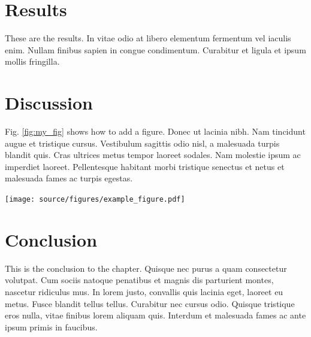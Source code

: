 \documentclass[12pt,a4paper,]{report}
\let\origfigure=\figure
\let\endorigfigure=\endfigure
\renewenvironment{figure}[1][]{%
\origfigure[b]
}{%
\endorigfigure
}
\begin{document}
\hypertarget{results-1}{%
\section{Results}\label{results-1}}

These are the results. In vitae odio at libero elementum fermentum vel
iaculis enim. Nullam finibus sapien in congue condimentum. Curabitur et
ligula et ipsum mollis fringilla.

\hypertarget{discussion-1}{%
\section{Discussion}\label{discussion-1}}

Fig. \ref{fig:my_fig} shows how to add a figure. Donec ut lacinia nibh.
Nam tincidunt augue et tristique cursus. Vestibulum sagittis odio nisl,
a malesuada turpis blandit quis. Cras ultrices metus tempor laoreet
sodales. Nam molestie ipsum ac imperdiet laoreet. Pellentesque habitant
morbi tristique senectus et netus et malesuada fames ac turpis egestas.

\begin{figure}[htbp]
\centering
\texttt{[image: source/figures/example\_figure.pdf]}
\caption[It's a boat]{RV Calypso is a former British Royal Navy minesweeper converted into a research vessel for the oceanographic researcher Jacques-Yves Cousteau. It was equipped with a mobile laboratory for underwater field research.}\label{fig:my_fig}
\end{figure}

\hypertarget{conclusion-2}{%
\section{Conclusion}\label{conclusion-2}}

This is the conclusion to the chapter. Quisque nec purus a quam
consectetur volutpat. Cum sociis natoque penatibus et magnis dis
parturient montes, nascetur ridiculus mus. In lorem justo, convallis
quis lacinia eget, laoreet eu metus. Fusce blandit tellus tellus.
Curabitur nec cursus odio. Quisque tristique eros nulla, vitae finibus
lorem aliquam quis. Interdum et malesuada fames ac ante ipsum primis in
faucibus.
\end{document}
